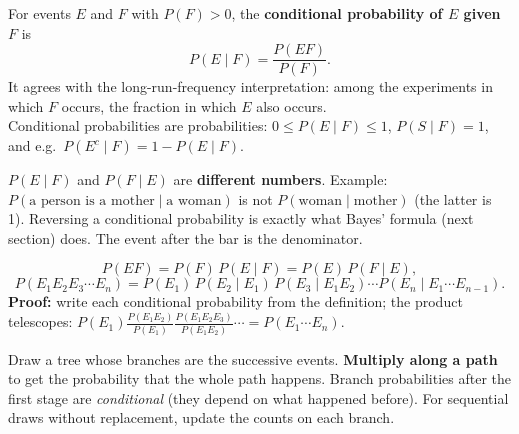 \documentclass[11pt]{article}
\begin{document}
\begin{defbox}
For events $E$ and $F$ with $P(F)>0$, the \textbf{conditional probability of $E$ given $F$} is
\[ P(E\mid F)=\frac{P(EF)}{P(F)}. \]
It agrees with the long-run-frequency interpretation: among the experiments in which $F$ occurs, the fraction in which $E$ also occurs.\\
Conditional probabilities are probabilities: $0\le P(E\mid F)\le1$, $P(S\mid F)=1$, and e.g.\ $P(E^c\mid F)=1-P(E\mid F)$.
\end{defbox}

\begin{warnbox}
$P(E\mid F)$ and $P(F\mid E)$ are \textbf{different numbers}. Example: $P(\text{a person is a mother}\mid\text{a woman})$ is not $P(\text{woman}\mid\text{mother})$ (the latter is 1). Reversing a conditional probability is exactly what Bayes' formula (next section) does. The event after the bar is the denominator.
\end{warnbox}

\begin{thmbox}
\[ P(EF)=P(F)\,P(E\mid F)=P(E)\,P(F\mid E), \]
\[ P(E_1E_2E_3\cdots E_n)=P(E_1)\,P(E_2\mid E_1)\,P(E_3\mid E_1E_2)\cdots P(E_n\mid E_1\cdots E_{n-1}). \]
\textbf{Proof:} write each conditional probability from the definition; the product telescopes: $P(E_1)\frac{P(E_1E_2)}{P(E_1)}\frac{P(E_1E_2E_3)}{P(E_1E_2)}\cdots=P(E_1\cdots E_n)$.
\end{thmbox}

\begin{methodbox}
Draw a tree whose branches are the successive events. \textbf{Multiply along a path} to get the probability that the whole path happens. Branch probabilities after the first stage are \emph{conditional} (they depend on what happened before). For sequential draws without replacement, update the counts on each branch.
\end{methodbox}
\end{document}
